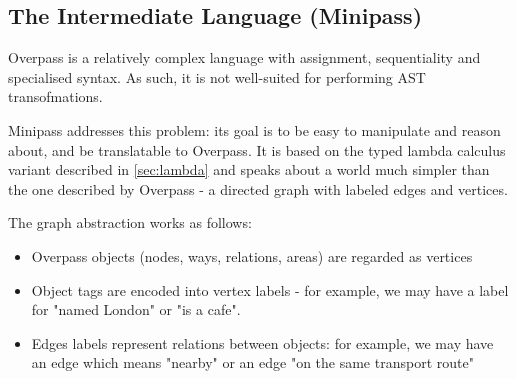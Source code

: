 \documentclass[main.tex]{subfiles}
\begin{document}
\subsection{The Intermediate Language (Minipass)}
\label{sec:minipass}
Overpass is a relatively complex language with assignment, sequentiality
and specialised syntax. As such, it is not well-suited for performing
AST transofmations.

Minipass addresses this problem: its goal is to be easy to manipulate
and reason about, and be translatable to Overpass. It is based on the typed
lambda calculus variant described in \ref{sec:lambda} and speaks about a
world much simpler than the one described by Overpass - a directed graph
with labeled edges and vertices.

The graph abstraction works as follows:
\begin{itemize}
    \item Overpass objects (nodes, ways, relations, areas) are regarded as
        vertices
    \item Object tags are encoded into vertex labels - for example, we
        may have a label for "named London" or "is a cafe".
    \item Edges labels represent relations between objects: for example,
        we may have an edge which means "nearby" or an edge "on the same
        transport route"
\end{itemize}

\end{document}
